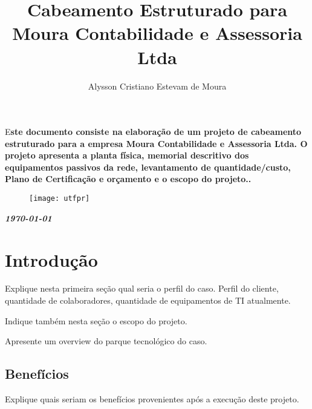 \documentclass[	DIV=calc,%
							paper=a4,%
							fontsize=12pt,%
							onecolumn]{scrartcl}	 					%
\title{Cabeamento Estruturado para Moura Contabilidade e Assessoria Ltda }					%
\author{Alysson Cristiano Estevam de Moura }  	%
\date{}																				%
\newcommand{\initial}[1]{%
     \lettrine[lines=3,lhang=0.3,nindent=0em]{
     				\color{DarkGoldenrod}
     				{\textsf{#1}}}{}}
\begin{document}
\maketitle
\thispagestyle{fancy} 	
\thispagestyle{empty}		%





\initial{E}\textbf{ste documento consiste na elaboração de um projeto de cabeamento estruturado para a empresa Moura Contabilidade e Assessoria Ltda. O projeto apresenta a planta física, memorial descritivo dos equipamentos passivos da rede, levantamento de quantidade/custo, Plano de Certificação e orçamento e o escopo do projeto..}


\begin{figure}
	\centering
	\texttt{[image: utfpr]}
\end{figure}

\vspace{2cm}
\centerline{\textit{\textbf{\today}}}

\clearpage
    \renewcommand*\listfigurename{Lista de figuras}
\listoffigures

\renewcommand*\listtablename{Lista de tabelas}
\listoftables




\clearpage
\renewcommand{\contentsname}{Sumário}
\tableofcontents
\clearpage

\section{Introdução}
Explique nesta primeira seção qual seria o perfil do caso. Perfil do cliente, quantidade de colaboradores, quantidade de equipamentos de TI atualmente.

Indique também nesta seção o escopo do projeto.

Apresente um overview do parque tecnológico do caso.
\subsection{Benefícios}
Explique quais seriam os benefícios provenientes após a execução deste projeto.
\end{document}
